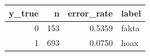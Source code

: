 \begin{tabular}{rrrl}
\toprule
y\_true & n & error\_rate & label \\
\midrule
0 & 153 & 0.5359 & fakta \\
1 & 693 & 0.0750 & hoax \\
\bottomrule
\end{tabular}
